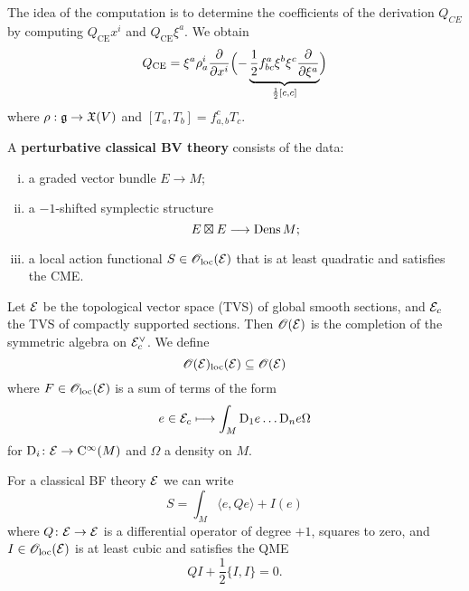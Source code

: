 The idea of the computation is to determine the coefficients of the derivation $Q_{CE}$ by computing $Q_{\text{CE}} x^i$ and $Q_{\text{CE}} \xi^a$.
We obtain
\begin{equation*}
  Q_{\text{CE}} = \xi^a \rho_a^i \frac{\partial}{\partial x^i}
  \Bigl( - \underbrace{\frac{1}{2} f_{bc}^a \xi^b \xi^c \frac{\partial}{\partial \xi^a}}_{\frac{1}{2} [c, c]} \Bigr)
\end{equation*}
where $\rho: \mathfrak{g} \to \mathfrak{X}(V)$ and $[T_a, T_b] = f_{a, b}^c T_c$.

\begin{definition}
  A \textbf{perturbative classical BV theory} consists of the data:
  \begin{enumerate}[i)]
    \item a graded vector bundle $E \to M$;
    \item a $-1$-shifted symplectic structure
    \begin{equation*}
      E \boxtimes E \longrightarrow \operatorname{Dens} M;
    \end{equation*}
    \item a local action functional $S \in \mathscr{O}_{\text{loc}}(\mathcal{E})$ that is at least quadratic and satisfies the CME.
  \end{enumerate}
  Let $\mathcal{E}$ be the topological vector space (TVS) of global smooth sections, and $\mathcal{E}_c$ the TVS of compactly supported sections.
  Then $\mathscr{O}(\mathcal{E})$ is the completion of the symmetric algebra on $\mathcal{E}_c^{\vee}$.
  We define
  \begin{equation*}
    \mathscr{O}(\mathcal{E})_{\text{loc}} (\mathcal{E}) \subseteq \mathscr{O}(\mathcal{E})
  \end{equation*}
  where $F \in \mathscr{O}_{\text{loc}} (\mathcal{E})$ is a sum of terms of the form
  \begin{equation*}
    e \in \mathcal{E}_c \longmapsto
    \int_M \mathrm{D}_1 e \dots \mathrm{D}_n e \Omega
  \end{equation*}
  for $\mathrm{D}_i \colon \mathcal{E} \to \mathrm{C}^{\infty} (M)$ and $\Omega$ a density on $M$.
\end{definition}

\begin{proposition}
  For a classical BF theory $\mathcal{E}$ we can write
  \begin{equation*}
    S = \int_M \langle e, Q e \rangle + I(e)
  \end{equation*}
  where $Q \colon \mathcal{E} \to \mathcal{E}$ is a differential operator of degree $+1$, squares to zero, and $I \in \mathscr{O}_{\text{loc}}(\mathcal{E})$ is at least cubic and satisfies the QME
  \begin{equation*}
    Q I + \frac{1}{2} \{ I, I \} = 0.
  \end{equation*}
\end{proposition}
